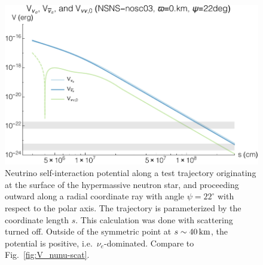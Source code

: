 \documentclass[aps,floatfix,prd,superscriptaddress,twocolumn]{revtex4-1}
\begin{document}
\begin{figure}
  \includegraphics[width=\columnwidth]{20170619-potentials-Vnue_Vnua_Vnu-000Mo-022deg-noscat}
  \caption{Neutrino self-interaction potential along a test trajectory
    originating at the surface of the hypermassive neutron star, and
    proceeding outward along a radial coordinate ray with angle
    $\psi=22^{\circ}$ with respect to the polar axis.
    The trajectory is parameterized by the coordinate length $s$.
    This calculation was done with scattering turned off.
    Outside of the symmetric point at $s\sim40\,{\rm km}$, the potential is
    positive, i.e.\ $\nu_e$-dominated.
    Compare to Fig.~\ref{fig:V_nunu-scat}.
    }
  \label{fig:V_nunu-noscat}
\end{figure}
\end{document}
